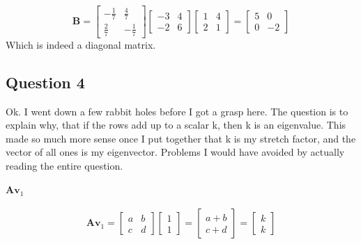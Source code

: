 \documentclass{article}
\begin{document}
                    \[
                        \mathbf{B}
                        =
                        \begin{bmatrix}-\frac{1}{7} & \frac{4}{7}\\\frac{2}{7} & -\frac{1}{7}\end{bmatrix}
                        \begin{bmatrix}-3 & 4\\-2 & 6\end{bmatrix}
                        \begin{bmatrix}1 & 4\\2 & 1\end{bmatrix}
                        =
                        \begin{bmatrix}5 & 0\\0 & -2\end{bmatrix}
                    \]
                    Which is indeed a diagonal matrix.
    \subsection{Question 4}
        Ok. I went down a few rabbit holes before I got a grasp here.
        The question is to explain why, that if the rows add up to a scalar k,
        then k is an eigenvalue. This made so much more sense once I put together that
        k is my stretch factor, and the vector of all ones is my eigenvector.
        Problems I would have avoided by actually reading the entire question.
        \paragraph{$\mathbf{A}\mathbf{v}_1$}
            \[
                \mathbf{A}\mathbf{v}_1
                =
                \begin{bmatrix}
                    a & b\\
                    c & d
                \end{bmatrix}
                \begin{bmatrix}
                    1\\1
                \end{bmatrix}
                =
                \begin{bmatrix}
                    a+b\\
                    c+d
                \end{bmatrix}
                =
                \begin{bmatrix}
                    k\\
                    k
                \end{bmatrix}
            \]
\end{document}
